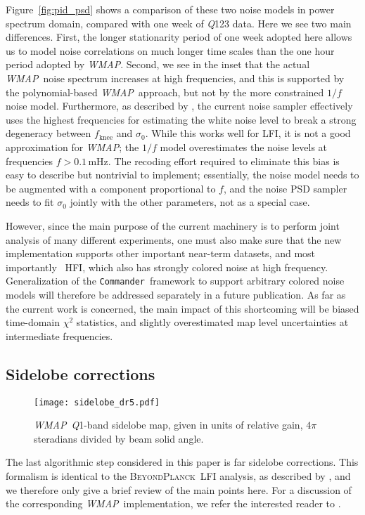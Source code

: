\documentclass[twocolumn]{aa}
\def\WMAP{\emph{WMAP}}
\def\commander{\texttt{Commander}}
\newcommand{\BP}{\textsc{BeyondPlanck}}
\newcommand{\Q}[0]{\textit Q}
\begin{document}
Figure~\ref{fig:pid_psd} shows a comparison of these two noise models in power
spectrum domain, compared with one week of \Q123 data. Here we see two main
differences. First, the longer stationarity period of one week adopted here
allows us to model noise correlations on much longer time scales than the one
hour period adopted by \WMAP. Second, we see in the inset that the actual
\WMAP\ noise spectrum increases at high frequencies, and this is supported by
the polynomial-based \WMAP\ approach, but not by the more constrained $1/f$
noise model. Furthermore, as described by \citet{bp06}, the current noise
sampler effectively uses the highest frequencies for estimating the white noise
level to break a strong degeneracy between $f_{\mathrm{knee}}$ and $\sigma_0$.
While this works well for LFI, it is not a good approximation for \WMAP; the
$1/f$ model overestimates the noise levels at frequencies
$f>0.1\,\mathrm{mHz}$. The recoding effort required to eliminate this bias is
easy to describe but nontrivial to implement; essentially, the noise model
needs to be augmented with a component proportional to $f$, and the noise PSD sampler
needs to fit $\sigma_0$ jointly with the other parameters, not as a special
case.

However, since the main purpose of the current machinery is to perform joint
analysis of many different experiments, one must also make sure that the new
implementation supports other important near-term datasets, and most
importantly \Planck\ HFI, which also has strongly colored noise at high
frequency. Generalization of the \commander\ framework to support arbitrary colored
noise models will therefore be addressed separately in a future publication. As
far as the current work is concerned, the main impact of this shortcoming will
be biased time-domain $\chi^2$ statistics, and slightly overestimated map level
uncertainties at intermediate frequencies. 


\subsection{Sidelobe corrections}
\label{sec:sidelobes}

\begin{figure}
    \texttt{[image: sidelobe\_dr5.pdf]}
	\caption{\WMAP\ \Q1-band sidelobe map, given in units of relative gain, $4\pi$ steradians divided by beam solid angle.}
    \label{fig:sidelobe_response}
\end{figure}

The last algorithmic step considered in this paper is far sidelobe corrections.
This formalism is identical to the \BP\ LFI analysis, as
described by \citet{bp08}, and we therefore only give a brief review of the
main points here. For a discussion of the corresponding \WMAP\ implementation,
we refer the interested reader to \citet{barnes2003}. 
\end{document}
